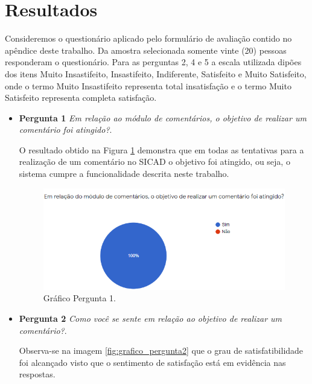 \documentclass[12pt, a4paper]{report}
\begin{document}
\section{Resultados} 
Consideremos o questionário aplicado pelo formulário de avaliação contido no apêndice deste trabalho. Da amostra selecionada somente vinte (20) pessoas responderam o questionário.
Para as perguntas 2, 4 e 5 a escala utilizada dipões dos itens Muito Insastifeito, Insastifeito, Indiferente, Satisfeito e Muito Satisfeito, onde o termo Muito Insastifeito representa total insatisfação e o termo Muito Satisfeito representa completa satisfação.

\begin{itemize}
\item{\textbf{ Pergunta 1}}
\textit{Em relação ao módulo de comentários, o objetivo de realizar um comentário foi atingido?}.

O resultado obtido na Figura \ref{fig:grafico_pergunta1} demonstra que em todas as tentativas para a realização de um comentário no SICAD o objetivo foi atingido, ou seja, o sistema cumpre a funcionalidade descrita neste trabalho.

\begin{figure}
\centering
\includegraphics[scale=0.8]{grafico_pergunta1.png}
\caption{Gráfico Pergunta 1.}
\label{fig:grafico_pergunta1}
\end{figure}

\item{\textbf{ Pergunta 2}}
\textit{Como você se sente em relação ao objetivo de realizar um comentário?}.


Observa-se na imagem \ref{fig:grafico_pergunta2} que o grau de satisfatibilidade foi alcançado visto que o sentimento de satisfação está em evidência nas respostas.


\end{itemize}
\end{document}
